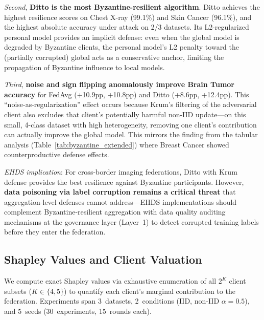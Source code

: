 \documentclass[conference]{IEEEtran}
\begin{document}
\textit{Second}, \textbf{Ditto is the most Byzantine-resilient algorithm}. Ditto achieves the highest resilience scores on Chest X-ray (99.1\%) and Skin Cancer (96.1\%), and the highest absolute accuracy under attack on 2/3 datasets. Its L2-regularized personal model provides an implicit defense: even when the global model is degraded by Byzantine clients, the personal model's L2 penalty toward the (partially corrupted) global acts as a conservative anchor, limiting the propagation of Byzantine influence to local models.

\textit{Third}, \textbf{noise and sign flipping anomalously improve Brain Tumor accuracy} for FedAvg (+10.9pp, +10.8pp) and Ditto (+8.6pp, +12.4pp). This ``noise-as-regularization'' effect occurs because Krum's filtering of the adversarial client also excludes that client's potentially harmful non-IID update---on this small, 4-class dataset with high heterogeneity, removing one client's contribution can actually improve the global model. This mirrors the finding from the tabular analysis (Table~\ref{tab:byzantine_extended}) where Breast Cancer showed counterproductive defense effects.

\textit{EHDS implication}: For cross-border imaging federations, Ditto with Krum defense provides the best resilience against Byzantine participants. However, \textbf{data poisoning via label corruption remains a critical threat} that aggregation-level defenses cannot address---EHDS implementations should complement Byzantine-resilient aggregation with data quality auditing mechanisms at the governance layer (Layer~1) to detect corrupted training labels before they enter the federation.

\subsection{Shapley Values and Client Valuation}
\label{sec:shapley_values}

We compute exact Shapley values via exhaustive enumeration of all $2^K$ client subsets ($K \in \{4, 5\}$) to quantify each client's marginal contribution to the federation. Experiments span 3~datasets, 2~conditions (IID, non-IID $\alpha{=}0.5$), and 5~seeds (30~experiments, 15~rounds each).
\end{document}
